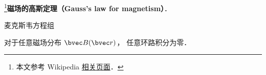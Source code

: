

\footnote{本文参考 Wikipedia \href{https://en.wikipedia.org/wiki/Gauss's_law_for_magnetism}{相关页面}．}\textbf{磁场的高斯定理（Gauss's law for magnetism）}．

麦克斯韦方程组

对于任意磁场分布 $\bvec B(\bvec r)$， 任意环路积分为零．
